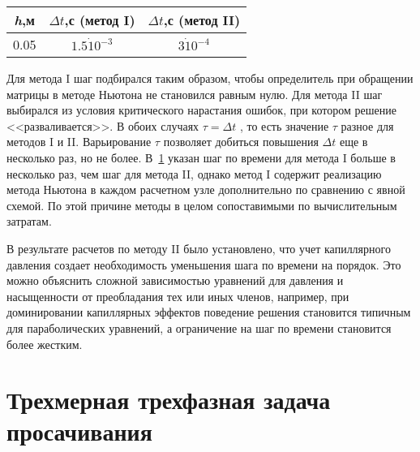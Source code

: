 \begin{table}[h]
\begin{center}
\begin{tabular}{|c|c|c|}
\hline
\textit {h},м & $\Delta t$,с (метод I) & $\Delta t$,с (метод II) \\
\hline
0.05 & $1.5\dot10^{-3}$ & $3\dot10^{-4}$ \\
\hline
\end{tabular}
\label{tabular:limits}
\end{center}
\end{table}

Для метода I шаг подбирался таким образом, чтобы определитель при обращении матрицы в методе
Ньютона не становился равным нулю. Для метода II шаг выбирался из
условия критического нарастания ошибок, при котором решение <<разваливается>>.
В обоих случаях $\tau=\Delta t$ , то есть значение $\tau$ разное для методов I и II. Варьирование $\tau$ позволяет добиться
повышения $\Delta t$ еще в несколько раз, но не более.
В~\ref{tabular:limits} указан шаг
по времени для метода I больше в несколько раз, чем шаг для метода II, однако
метод I содержит реализацию метода Ньютона в каждом расчетном узле дополнительно по сравнению с явной схемой. По этой причине методы в целом сопоставимыми по вычислительным затратам.

В результате расчетов по методу II было установлено, что учет капиллярного
давления создает необходимость уменьшения шага по времени на порядок. Это можно объяснить сложной зависимостью уравнений для давления и насыщенности от преобладания тех или иных членов, например, при
доминировании капиллярных эффектов поведение решения становится типичным для
параболических уравнений, а ограничение на шаг по времени становится более жестким. 

\section{Трехмерная трехфазная задача просачивания} \label{ch:ch3/sect3}

